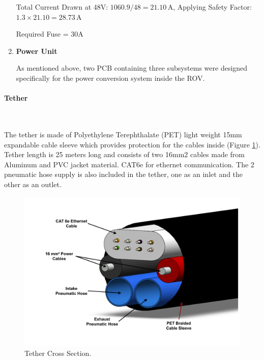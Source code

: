 \begin{enumerate}[label=(\roman*), leftmargin=0pt, itemindent=20pt]
    Total Current Drawn at 48V: \( 1060.9 / 48 = 21.10 \, \text{A} \), Applying Safety Factor: \( 1.3 \times 21.10 = 28.73 \, \text{A} \)
    \setlength{\parskip}{0pt}

    Required Fuse = 30A

    \item \textbf{Power Unit}
    
    As mentioned above, two PCB containing three subsystems were designed specifically for the power conversion system inside the ROV.
\end{enumerate}

\vspace{-0.8cm}
\paragraph{Tether} \ \\
\vspace{-0.5cm}

The tether is made of Polyethylene Terephthalate (PET) light weight 15mm expandable cable sleeve which provides protection for the cables inside (Figure \ref{fig:tether}). Tether length is 25 meters long and consists of two 16mm2 cables made from Aluminum and PVC jacket material. CAT6e for ethernet communication. The 2 pneumatic hose supply is also included in the tether, one as an inlet and the other as an outlet.

\begin{figure}[h!]
    \centering
    \includegraphics[width=0.8\columnwidth]{Sections/2Design Rationale/images/Tether.png}
    \caption{Tether Cross Section.}
    \label{fig:tether}
\end{figure}